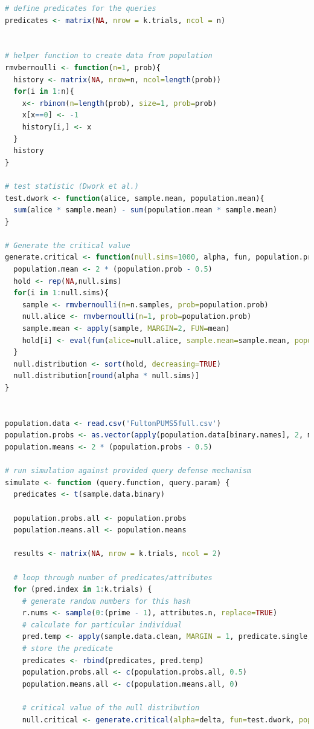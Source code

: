 \documentclass[12pt]{article}
\begin{document}
\begin{lstlisting}[language=R]
# define predicates for the queries
predicates <- matrix(NA, nrow = k.trials, ncol = n)


# helper function to create data from population
rmvbernoulli <- function(n=1, prob){
  history <- matrix(NA, nrow=n, ncol=length(prob))
  for(i in 1:n){
    x<- rbinom(n=length(prob), size=1, prob=prob)
    x[x==0] <- -1
    history[i,] <- x
  }
  history
}

# test statistic (Dwork et al.)
test.dwork <- function(alice, sample.mean, population.mean){
  sum(alice * sample.mean) - sum(population.mean * sample.mean)
}

# Generate the critical value
generate.critical <- function(null.sims=1000, alpha, fun, population.prob){
  population.mean <- 2 * (population.prob - 0.5)
  hold <- rep(NA,null.sims)
  for(i in 1:null.sims){
    sample <- rmvbernoulli(n=n.samples, prob=population.prob)
    null.alice <- rmvbernoulli(n=1, prob=population.prob)
    sample.mean <- apply(sample, MARGIN=2, FUN=mean)
    hold[i] <- eval(fun(alice=null.alice, sample.mean=sample.mean, population.mean=population.mean))
  }
  null.distribution <- sort(hold, decreasing=TRUE)
  null.distribution[round(alpha * null.sims)]
}


population.data <- read.csv('FultonPUMS5full.csv')
population.probs <- as.vector(apply(population.data[binary.names], 2, mean))
population.means <- 2 * (population.probs - 0.5)

# run simulation against provided query defense mechanism
simulate <- function (query.function, query.param) {  
  predicates <- t(sample.data.binary)
  
  population.probs.all <- population.probs
  population.means.all <- population.means
  
  results <- matrix(NA, nrow = k.trials, ncol = 2)
  
  # loop through number of predicates/attributes
  for (pred.index in 1:k.trials) {
    # generate random numbers for this hash
    r.nums <- sample(0:(prime - 1), attributes.n, replace=TRUE)
    # calculate for particular individual
    pred.temp <- apply(sample.data.clean, MARGIN = 1, predicate.single, r.nums)
    # store the predicate
    predicates <- rbind(predicates, pred.temp)
    population.probs.all <- c(population.probs.all, 0.5)
    population.means.all <- c(population.means.all, 0)
    
    # critical value of the null distribution
    null.critical <- generate.critical(alpha=delta, fun=test.dwork, population.prob=population.probs.all)
    

\end{lstlisting}
\end{document}
